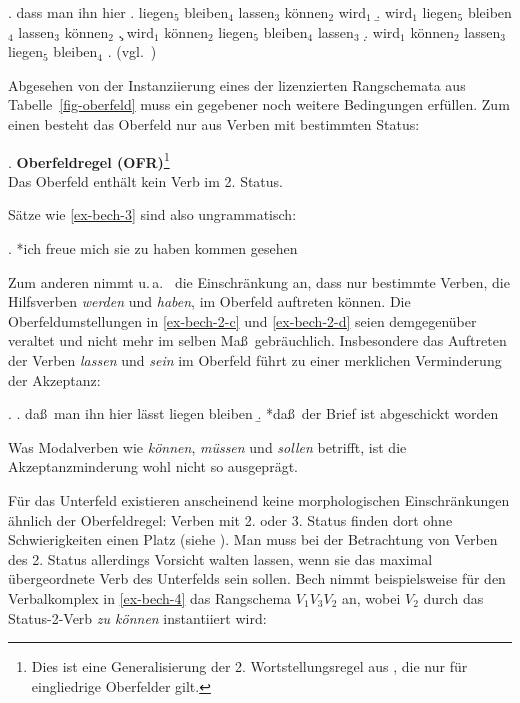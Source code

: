 \ex. dass man ihn hier \label{ex-bech-2}
\a. liegen$_5$ bleiben$_4$ lassen$_3$ können$_2$ wird$_1$
\b. wird$_1$ liegen$_5$ bleiben$_4$ lassen$_3$ können$_2$ 
\c. wird$_1$ können$_2$ liegen$_5$ bleiben$_4$ lassen$_3$  \label{ex-bech-2-c}
\d. wird$_1$ können$_2$ lassen$_3$ liegen$_5$ bleiben$_4$  \label{ex-bech-2-d}
\z. (vgl.\ \citealt[\S 61]{Bech:55})  

\largerpage%
Abgesehen von der Instanziierung eines der lizenzierten Rangschemata aus Tabelle~\ref{fig-oberfeld} muss ein gegebener  noch weitere Bedingungen erfüllen. Zum einen besteht das Oberfeld nur aus Verben mit bestimmten Status: 

\ex. \label{ex-ofr} \textbf{Oberfeldregel (OFR)}\footnote{Dies ist eine Generalisierung der 2. Wortstellungsregel aus \citet[\S 11]{Bech:63}, die nur für eingliedrige Oberfelder gilt.} \\
Das Oberfeld enthält kein Verb im 2. Status.

Sätze wie \ref{ex-bech-3} sind also ungrammatisch:\largerpage%

\ex. *ich freue mich sie zu haben kommen gesehen \hfill \citep[\S 11]{Bech:63}\label{ex-bech-3}

Zum anderen nimmt u.\,a.\ \citet[75ff]{Meurers:99} die Einschränkung an, dass nur bestimmte Verben, die Hilfsverben {\it werden} und {\it haben}, im Oberfeld auftreten können. Die Oberfeldumstellungen in \ref{ex-bech-2-c} und \ref{ex-bech-2-d} seien demgegenüber veraltet und nicht mehr im selben Ma\ss \ gebräuchlich. Insbesondere das Auftreten der Verben {\it lassen} und {\it sein} im Oberfeld führt zu einer merklichen Verminderung der Akzeptanz:

\ex. 
\a. da\ss \ man ihn hier lässt liegen bleiben \hfill \citep[\S 61]{Bech:55} 
\b. *da\ss \ der Brief ist abgeschickt worden \hfill \citep[(125a)]{Meurers:99}

Was Modalverben wie {\it können}, {\it müssen} und {\it sollen} betrifft, ist die Akzeptanzminderung wohl nicht so ausgeprägt. 

Für das Unterfeld existieren anscheinend keine morphologischen Einschränkungen ähnlich der Oberfeldregel: Verben mit 2. oder 3. Status finden dort ohne Schwierigkeiten einen Platz (siehe \citealt[80ff]{Meurers:99}). Man muss bei der Betrachtung von Verben des 2. Status allerdings Vorsicht walten lassen, wenn sie das maximal übergeordnete Verb des Unterfelds sein sollen. Bech nimmt beispielsweise für den Verbalkomplex  in \ref{ex-bech-4} das Rangschema $V_1 V_3 V_2$ an, wobei $V_2$ durch das Status-2-Verb {\it zu können} instantiiert wird:

